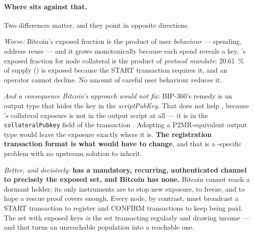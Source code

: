 \paragraph{Where \Flux{} sits against that.} Two differences matter, and they point in opposite
directions.

\emph{Worse:} Bitcoin's exposed fraction is the product of user \emph{behaviour} --- spending, address
reuse --- and it grows monotonically because each spend reveals a key. \Flux's exposed fraction for
node collateral is the product of \emph{protocol mandate}: \SI{20.61}{\percent} of supply
() is exposed because the START transaction requires it, and an operator cannot
decline. No amount of careful user behaviour reduces it.

\emph{And a consequence Bitcoin's approach would not fix:} BIP-360's remedy is an output type that
hides the key in the \emph{scriptPubKey}. That does not help \Flux, because \Flux{}'s collateral
exposure is not in the output script at all --- it is in the \texttt{collateral\allowbreak{}Pubkey} field of the
\FluxNode{} transaction . Adopting a
P2MR-equivalent output type would leave the exposure exactly where it is. \textbf{The registration
transaction format is what would have to change}, and that is a \Flux-specific problem with no
upstream solution to inherit.

\emph{Better, and decisively:} \textbf{\Flux{} has a mandatory, recurring, authenticated channel to
precisely the exposed set, and Bitcoin has none.} Bitcoin cannot reach a dormant holder; its only
instruments are to stop new exposure, to freeze, and to hope a rescue proof covers enough. Every
\Flux{} node, by contrast, must broadcast a START transaction to register and CONFIRM transactions to
keep being paid. The set with exposed keys \emph{is} the set transacting regularly and drawing income
--- and that turns an unreachable population into a reachable one.

